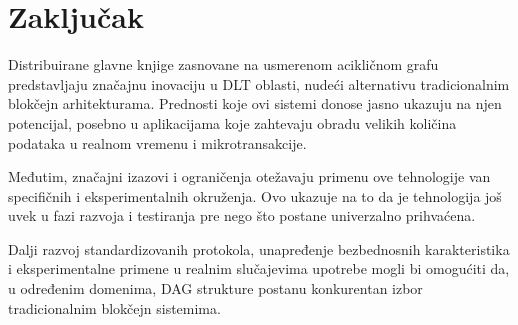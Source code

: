 \section{Zaključak}

Distribuirane glavne knjige zasnovane na usmerenom acikličnom grafu predstavljaju značajnu inovaciju u DLT oblasti, nudeći alternativu tradicionalnim blokčejn arhitekturama. Prednosti koje ovi sistemi donose jasno ukazuju na njen potencijal, posebno u aplikacijama koje zahtevaju obradu velikih količina podataka u realnom vremenu i mikrotransakcije.

Međutim, značajni izazovi i ograničenja otežavaju primenu ove tehnologije van specifičnih i eksperimentalnih okruženja. Ovo ukazuje na to da je tehnologija još uvek u fazi razvoja i testiranja pre nego što postane univerzalno prihvaćena.

Dalji razvoj standardizovanih protokola, unapređenje bezbednosnih karakteristika i eksperimentalne primene u realnim slučajevima upotrebe mogli bi omogućiti da, u određenim domenima, DAG strukture postanu konkurentan izbor tradicionalnim blokčejn sistemima.